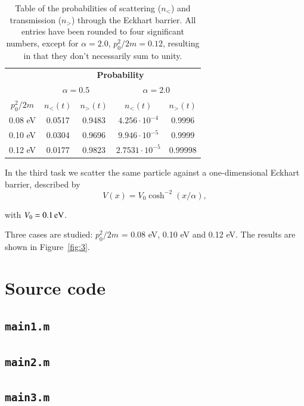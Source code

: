 \begin{table}[H]
	\centering
	\caption{Table of the probabilities of scattering ($n_<$) and transmission ($n_>$) through the Eckhart barrier. All entries have been rounded to four significant numbers, except for $\alpha = 2.0$, $p_0^2/2m = 0.12$, resulting in that they don't necessarily sum to unity.}
	\begin{tabular}{c|cc|cc}
					& \multicolumn{4}{c}{\textbf{Probability}} \\
					& \multicolumn{2}{c|}{$\alpha = 0.5$} & \multicolumn{2}{c}{$\alpha = 2.0$} \\
		$p_0^2/2m$	& $n_<(t)$	& $n_>(t)$	& $n_<(t)$	& $n_>(t)$	\\ \hline
		0.08 eV		& 0.0517	& 0.9483	& $4.256 \cdot 10^{-4}$	& 0.9996	\\
		0.10 eV		& 0.0304	& 0.9696	& $9.946 \cdot 10^{-5}$	& 0.9999	\\
		0.12 eV		& 0.0177	& 0.9823	& $2.7531 \cdot 10^{-5}$ & 0.99998
	\end{tabular}
	\label{tab:3}
\end{table}

In the third task we scatter the same particle against a one-dimensional Eckhart barrier, described by
\begin{equation}
V(x) = V_0 \cosh^{-2} (x/\alpha),
\end{equation}


with $V_0 = \unit[0.1]{eV}$.

Three cases are studied: $p_0^2/2m$ = 0.08 eV, 0.10 eV and 0.12 eV. The results are shown in Figure~\ref{fig:3}.








\appendix
\section{Source code}

\subsection{\texttt{main1.m}}


\subsection{\texttt{main2.m}}


\subsection{\texttt{main3.m}}


%

